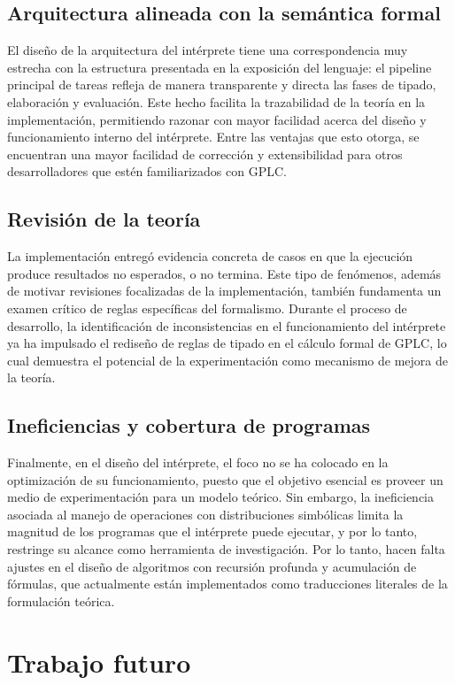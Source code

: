 \subsection{Arquitectura alineada con la semántica formal}
El diseño de la arquitectura del intérprete tiene una correspondencia muy estrecha
con la estructura presentada en la exposición del lenguaje: el pipeline principal de
tareas refleja de manera transparente y directa las fases de tipado, elaboración y evaluación. Este hecho facilita la trazabilidad de la teoría en la implementación, permitiendo razonar con mayor facilidad acerca del diseño y funcionamiento interno del intérprete. Entre las ventajas que esto otorga, se encuentran una mayor facilidad de corrección y extensibilidad para otros desarrolladores que estén familiarizados con GPLC.

\subsection{Revisión de la teoría}
La implementación entregó evidencia concreta de casos en que la
ejecución produce resultados no esperados, o no termina. Este tipo de
fenómenos, además de motivar revisiones focalizadas de la
implementación, también fundamenta un examen crítico de reglas
específicas del formalismo. Durante el proceso de desarrollo, la
identificación de inconsistencias en el funcionamiento del intérprete
ya ha impulsado el rediseño de reglas de tipado en el cálculo formal
de GPLC, lo cual demuestra el potencial de la experimentación como
mecanismo de mejora de la teoría.


\subsection{Ineficiencias y cobertura de programas}
Finalmente, en el diseño del intérprete, el foco no se ha colocado en la
optimización de su funcionamiento, puesto que el objetivo esencial es
proveer un medio de experimentación para un modelo teórico. Sin
embargo, la ineficiencia asociada al manejo de operaciones con
distribuciones simbólicas limita la magnitud de los programas que el
intérprete puede ejecutar, y por lo tanto, restringe su alcance como
herramienta de investigación. Por lo tanto, hacen falta ajustes en el
diseño de algoritmos con recursión profunda y acumulación de fórmulas,
que actualmente están implementados como traducciones literales de la
formulación teórica.

\section{Trabajo futuro}

